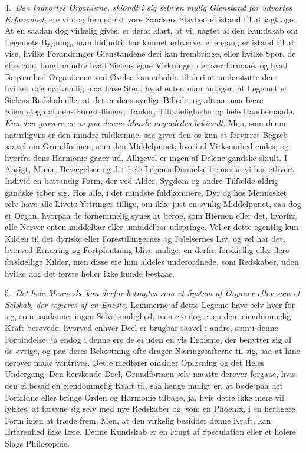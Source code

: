 \documentclass[12pt,a4paper]{article}
\newcommand{\opage}[1]{\marginnote{\footnotesize\textit{[#1]}}}
\begin{document}
4.~\emph{Den indvortes Organisme, skiøndt i sig selv en mulig Gienstand for
udvortes Erfarenhed}, ere vi dog formedelst vore Sandsers Sløvhed ei istand
\opage{13} til at iagttage. At en saadan dog virkelig gives, er deraf klart, at vi, uagtet
al den Kundskab om Legemets Bygning, man hidindtil har kunnet erhverve, ei engang
er istand til at vise, hvilke Forandringer Gienstandene deri kan frembringe,
eller hvilke Spor, de efterlade; langt mindre hvad Sielens egne Virkninger derover
formaae, og hvad Beqvemhed Organismen ved Øvelse kan erholde til deri at
understøtte den: hvilket dog nødvendig maa have Sted, hvad enten man antager, at
Legemet er Sielens Redskab eller at det er dens synlige Billede, og altsaa maa
bære Kiendetegn af dens Forestillinger, Tanker, Tilbøieligheder og hele
Handlemaade. \emph{Kun den grovere er os paa denne Maade nogenledes bekiendt.}
Men, som denne naturligviis er den mindre fuldkomne, saa giver den os kun et
forvirret Begreb saavel om Grundformen, som den Middelpunct, hvori al Virksomhed
endes, og hvorfra dens Harmonie gaaer ud. Alligevel er ingen af Delene gandske
skiult. I Ansigt, Miner, Bevægelser og det hele Legems Dannelse bemærke vi hos
ethvert Individ en bestandig Form, der ved Alder, Sygdom og andre Tilfælde aldrig
gandske taber sig. Hos alle, i det mindste fuldkomnere, Dyr og hos Mennesket selv
have alle Livets Yttringer tillige, om ikke just en synlig Middelpunct, saa dog et
Organ, hvorpaa de fornemmelig synes at beroe, som Hiernen eller det, hvorfra alle
Nerver enten middelbar eller umiddelbar udspringe. Vel er
\opage{14} dette egentlig kun Kilden til det dyriske eller Forestillingernes og Følelsernes
Liv, og vel har det, hvorved Ernæring og Fortplantning blive mulige, en derfra
forskiellig eller flere forskiellige Kilder, men disse ere hiin aldeles
underordnede, som Redskaber, uden hvilke dog det første heller ikke kunde bestaae.

5.~\emph{Det hele Menneske kan derfor betragtes som et System af Organer eller
som et Selskab, der regieres af en Eneste.} Lemmerne af dette Legeme have selv
hver for sig, som saadanne, ingen Selvstændighed, men ere dog ei en dem
eiendommelig Kraft berøvede, hvorved enhver Deel er brugbar saavel i andre, som i
denne Forbindelse: ja endog i denne ere de ei uden en vis Egoisme, der benytter
sig af de øvrige, og paa deres Bekostning ofte drager Næringssafterne til sig, saa
at hine derover maae vantrives. Dette medfører omsider Opløsning og det Heles
Undergang. Den herskende Deel, Grundformen selv maatte derover forgaae, hvis den
ei besad en eiendommelig Kraft til, saa længe muligt er, at bøde paa det Forfaldne
eller bringe Orden og Harmonie tilbage, ja, hvis dette ikke mere vil lykkes, at
forsyne sig selv med nye Redskaber og, som en Phoenix, i en herligere Form igien
at træde frem. Men, at den virkelig besidder denne Kraft, kan Erfarenhed ikke
lære. Denne Kundskab er en Frugt af Speculation eller et høiere Slags Philosophie.
\end{document}
